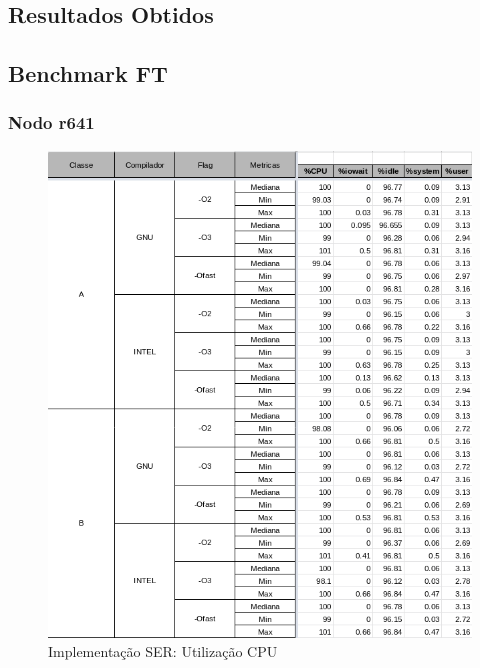 \documentclass{article}
\begin{document}
\newpage 
\begin{appendices}
\section{Resultados Obtidos}

\subsection{Benchmark FT}

\subsubsection{Nodo r641}

\begin{figure}[H]
    \centering
    \includegraphics[width=12cm]{Pictures/FT_r641_SER_CPU.png}
    \caption{Implementação SER: Utilização CPU}
    \label{figure:FT_r641_SER_CPU}
\end{figure}


\end{appendices}
\end{document}
